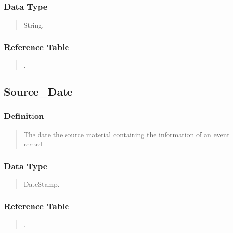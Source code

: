 \documentclass[letterpaper,10pt,english]{sphinxmanual}
\begin{document}
\subsubsection{Data Type}
\label{\detokenize{database_schema:id15}}\begin{quote}

\sphinxAtStartPar
String.
\end{quote}


\subsubsection{Reference Table}
\label{\detokenize{database_schema:id16}}\begin{quote}

\sphinxAtStartPar
{\hyperref[\detokenize{database_schema:overview-table}]{}}.
\end{quote}


\subsection{Source\_Date}
\label{\detokenize{database_schema:source-date}}

\subsubsection{Definition}
\label{\detokenize{database_schema:id17}}\begin{quote}

\sphinxAtStartPar
The date the source material containing the information of an event record.
\end{quote}


\subsubsection{Data Type}
\label{\detokenize{database_schema:id18}}\begin{quote}

\sphinxAtStartPar
DateStamp.
\end{quote}


\subsubsection{Reference Table}
\label{\detokenize{database_schema:id19}}\begin{quote}

\sphinxAtStartPar
{\hyperref[\detokenize{database_schema:overview-table}]{}}.
\end{quote}
\end{document}
